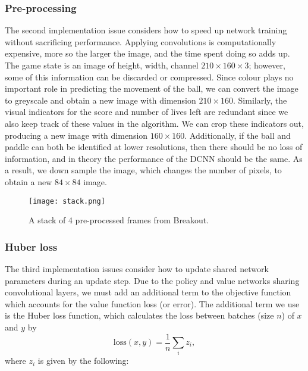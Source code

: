 \documentclass[12pt,a4paper]{article}
\begin{document}
\subsubsection{Pre-processing}
The second implementation issue considers how to speed up network training without sacrificing performance. Applying convolutions is computationally expensive, more so the larger the image, and the time spent doing so adds up. The game state is an image of height, width, channel $210 \times 160 \times 3$; however, some of this information can be discarded or compressed. Since colour plays no important role in predicting the movement of the ball, we can convert the image to greyscale and obtain a new image with dimension $210 \times 160$. Similarly, the visual indicators for the score and number of lives left are redundant since we also keep track of these values in the algorithm. We can crop these indicators out, producing a new image with dimension $160 \times 160$. Additionally, if the ball and paddle can both be identified at lower resolutions, then there should be no loss of information, and in theory the performance of the DCNN should be the same. As a result, we down sample the image, which changes the number of pixels, to obtain a new $84 \times 84$ image. 


\begin{figure}[ht]
    \centering
    \texttt{[image: stack.png]}
    \caption{A stack of 4 pre-processed frames from Breakout.}
  \end{figure}

\subsubsection{Huber loss}
The third implementation issues consider how to update shared network parameters during an update step. Due to the policy and value networks sharing convolutional layers, we must add an additional term to the objective function which accounts for the value function loss (or error). The additional term we use is the Huber loss function, which calculates the loss between batches (size $n$) of $x$ and $y$ by $$\text{loss}(x, y) = \frac{1}{n} \sum_{i} z_{i},$$ where $z_i$ is given by the following:
\end{document}
